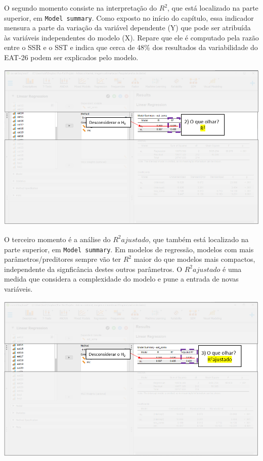 \documentclass[
]{book}
\begin{document}
O segundo momento consiste na interpretação do \(R^2\), que está localizado na parte superior, em \texttt{Model\ summary}. Como exposto no início do capítulo, essa indicador mensura a parte da variação da variável dependente (Y) que pode ser atribuída às variáveis independentes do modelo (X). Repare que ele é computado pela razão entre o SSR e o SST e indica que cerca de 48\% dos resultados da variabilidade do EAT-26 podem ser explicados pelo modelo.

\includegraphics{./img/cap_reg_multipla_resultado_2.png}

O terceiro momento é a análise do \(R^2 ajustado\), que também está localizado na parte superior, em \texttt{Model\ summary}. Em modelos de regressão, modelos com mais parâmetros/preditores sempre vão ter \(R^2\) maior do que modelos mais compactos, independente da signficância destes outros parâmetros. O \(R^2 ajustado\) é uma medida que considera a complexidade do modelo e pune a entrada de novas variáveis.

\includegraphics{./img/cap_reg_multipla_resultado_3.png}
\end{document}
